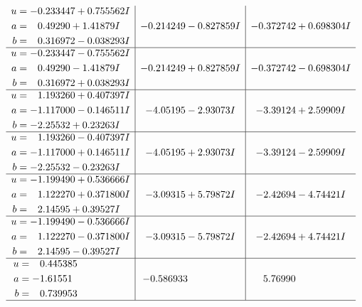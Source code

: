 \documentclass[1p]{elsarticle_modified}
\theoremstyle{definition}
\begin{document}
$$\begin{array}{c|c|c}
\begin{aligned}
u &= -0.233447 + 0.755562 I \\
a &= \phantom{-}0.49290 + 1.41879 I \\
b &= \phantom{-}0.316972 - 0.038293 I\end{aligned}
 & -0.214249 - 0.827859 I & -0.372742 + 0.698304 I \\ \hline\begin{aligned}
u &= -0.233447 - 0.755562 I \\
a &= \phantom{-}0.49290 - 1.41879 I \\
b &= \phantom{-}0.316972 + 0.038293 I\end{aligned}
 & -0.214249 + 0.827859 I & -0.372742 - 0.698304 I \\ \hline\begin{aligned}
u &= \phantom{-}1.193260 + 0.407397 I \\
a &= -1.117000 - 0.146511 I \\
b &= -2.25532 + 0.23263 I\end{aligned}
 & -4.05195 - 2.93073 I & -3.39124 + 2.59909 I \\ \hline\begin{aligned}
u &= \phantom{-}1.193260 - 0.407397 I \\
a &= -1.117000 + 0.146511 I \\
b &= -2.25532 - 0.23263 I\end{aligned}
 & -4.05195 + 2.93073 I & -3.39124 - 2.59909 I \\ \hline\begin{aligned}
u &= -1.199490 + 0.536666 I \\
a &= \phantom{-}1.122270 + 0.371800 I \\
b &= \phantom{-}2.14595 + 0.39527 I\end{aligned}
 & -3.09315 + 5.79872 I & -2.42694 - 4.74421 I \\ \hline\begin{aligned}
u &= -1.199490 - 0.536666 I \\
a &= \phantom{-}1.122270 - 0.371800 I \\
b &= \phantom{-}2.14595 - 0.39527 I\end{aligned}
 & -3.09315 - 5.79872 I & -2.42694 + 4.74421 I \\ \hline\begin{aligned}
u &= \phantom{-}0.445385\phantom{ +0.000000I} \\
a &= -1.61551\phantom{ +0.000000I} \\
b &= \phantom{-}0.739953\phantom{ +0.000000I}\end{aligned}
 & -0.586933\phantom{ +0.000000I} & \phantom{-}5.76990\phantom{ +0.000000I}\\
 \hline 
 \end{array}$$\newpage
\end{document}

